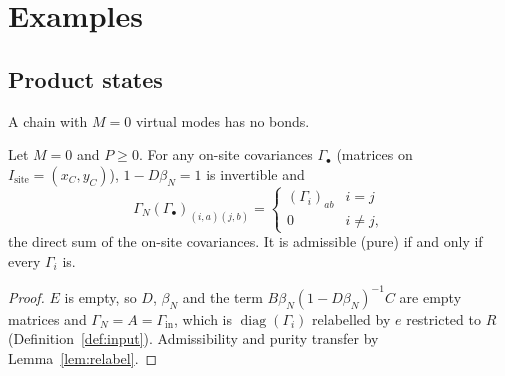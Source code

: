\section{Examples}
\label{sec:examples}

\subsection{Product states}
\label{sec:product}
A chain with $M=0$ virtual modes has no bonds.

\begin{proposition}\label{prop:M0}
Let $M=0$ and $P\geq0$. For any on-site covariances $\Gamma_\bullet$ (matrices on
$I_{\mathrm{site}}=(x_C,y_C)$), $1-D\beta_N=1$ is invertible and
\[
 \Gamma_N(\Gamma_\bullet)_{(i,a)(j,b)}=\begin{cases}(\Gamma_i)_{ab}&i=j\\0&i\neq j,\end{cases}
\]
the direct sum of the on-site covariances. It is admissible (pure) if and only if
every $\Gamma_i$ is.
\end{proposition}
\begin{proof}
$E$ is empty, so $D$, $\beta_N$ and the term $B\beta_N(1-D\beta_N)^{-1}C$ are empty
matrices and $\Gamma_N=A=\Gamma_{\mathrm{in}}$, which is $\operatorname{diag}(\Gamma_i)$
relabelled by $e$ restricted to $R$ (Definition~\ref{def:input}). Admissibility and
purity transfer by Lemma~\ref{lem:relabel}.
\end{proof}

